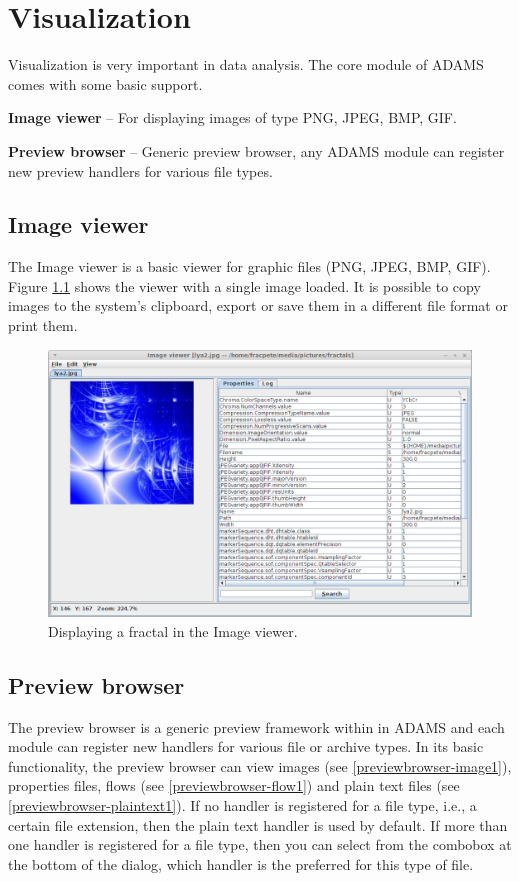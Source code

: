 
\chapter{Visualization}
Visualization is very important in data analysis. The core module of ADAMS
comes with some basic support.
\begin{tight_itemize}
	\item \textbf{Image viewer} -- For displaying images of type PNG, JPEG, BMP,
	GIF.
	\item \textbf{Preview browser} -- Generic preview browser, any ADAMS module can
	register new preview handlers for various file types.
\end{tight_itemize}

\section{Image viewer}
The Image viewer is a basic viewer for graphic files (PNG, JPEG, BMP, GIF).
Figure \ref{imageviewer1} shows the viewer with a single image loaded. It is
possible to copy images to the system's clipboard, export or save them in a
different file format or print them.

\begin{figure}[htb]
  \centering
  \includegraphics[width=12.0cm]{images/imageviewer1.png}
  \caption{Displaying a fractal in the Image viewer.}
  \label{imageviewer1}
\end{figure}

\section{Preview browser}
The preview browser is a generic preview framework within in ADAMS and each
module can register new handlers for various file or archive types. In its basic
functionality, the preview browser can view images (see
\ref{previewbrowser-image1}), properties files, flows (see
\ref{previewbrowser-flow1}) and plain text files (see
\ref{previewbrowser-plaintext1}). If no handler is registered for a file type,
i.e., a certain file extension, then the plain text handler is used by default.
If more than one handler is registered for a file type, then you can select
from the combobox at the bottom of the dialog, which handler is the preferred
for this type of file.

